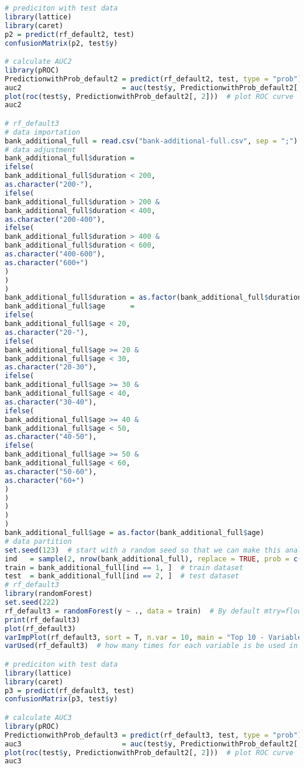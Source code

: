 \documentclass[12pt, a4paper, bibliography=totoc, english]{scrartcl}
\begin{document}
\begin{lstlisting}[language = R]
# prediciton with test data
library(lattice)
library(caret)
p2 = predict(rf_default2, test)
confusionMatrix(p2, test$y)

# calculate AUC2
library(pROC)
PredictionwithProb_default2 = predict(rf_default2, test, type = "prob")
auc2                        = auc(test$y, PredictionwithProb_default2[, 2])
plot(roc(test$y, PredictionwithProb_default2[, 2]))  # plot ROC curve
auc2

# rf_default3
# data importation
bank_additional_full = read.csv("bank-additional-full.csv", sep = ";")
# data adjustment
bank_additional_full$duration =
ifelse(
bank_additional_full$duration < 200,
as.character("200-"),
ifelse(
bank_additional_full$duration > 200 &
bank_additional_full$duration < 400,
as.character("200-400"),
ifelse(
bank_additional_full$duration > 400 &
bank_additional_full$duration < 600,
as.character("400-600"),
as.character("600+")
)
)
)
bank_additional_full$duration = as.factor(bank_additional_full$duration)
bank_additional_full$age      =
ifelse(
bank_additional_full$age < 20,
as.character("20-"),
ifelse(
bank_additional_full$age >= 20 &
bank_additional_full$age < 30,
as.character("20-30"),
ifelse(
bank_additional_full$age >= 30 &
bank_additional_full$age < 40,
as.character("30-40"),
ifelse(
bank_additional_full$age >= 40 &
bank_additional_full$age < 50,
as.character("40-50"),
ifelse(
bank_additional_full$age >= 50 &
bank_additional_full$age < 60,
as.character("50-60"),
as.character("60+")
)
)
)
)
)
bank_additional_full$age = as.factor(bank_additional_full$age)
# data partition
set.seed(123)  # start with a random seed so that we can make this analysis repeatable 
ind   = sample(2, nrow(bank_additional_full), replace = TRUE, prob = c(0.8, 0.2))  # divide the dataset into two parts
train = bank_additional_full[ind == 1, ]  # train dataset
test  = bank_additional_full[ind == 2, ]  # test dataset
# rf_default3
library(randomForest)
set.seed(222)
rf_default3 = randomForest(y ~ ., data = train)  # By default mtry=floor(sqrt(ncol(x)))  ntree = 500
print(rf_default3)
plot(rf_default3)
varImpPlot(rf_default3, sort = T, n.var = 10, main = "Top 10 - Variable Importance")  # showing the importance of the variables in plot
varUsed(rf_default3)  # how many times for each variable is be used in the tuned random forest model

# prediciton with test data
library(lattice)
library(caret)
p3 = predict(rf_default3, test)
confusionMatrix(p3, test$y)

# calculate AUC3
library(pROC)
PredictionwithProb_default3 = predict(rf_default3, test, type = "prob")
auc3                        = auc(test$y, PredictionwithProb_default2[, 2])
plot(roc(test$y, PredictionwithProb_default2[, 2]))  # plot ROC curve
auc3


\end{lstlisting}
\end{document}
